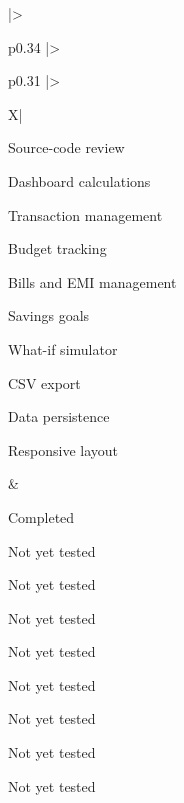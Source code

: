 \documentclass[12pt,a4paper]{article}
\begin{document}
\begin{tabularx}{\textwidth}{
|>{\raggedright\arraybackslash}p{0.34\textwidth}
|>{\raggedright\arraybackslash}p{0.31\textwidth}
|>{\raggedright\arraybackslash}X|
}
\parbox[t][14.45cm][t]{\linewidth}{
\begin{compresslist}
    \item Source-code review
    \vspace{1.00cm}
    \item Dashboard calculations
    \vspace{1.00cm}
    \item Transaction management
    \vspace{1.00cm}
    \item Budget tracking
    \vspace{0.60cm}
    \item Bills and EMI management
    \vspace{0.50cm}
    \item Savings goals
    \vspace{0.50cm}
    \item What-if simulator
    \vspace{0.75cm}
    \item CSV export
    \vspace{1.00cm}
    \item Data persistence
    \vspace{1.00cm}
    \item Responsive layout
\end{compresslist} 
}
&
\parbox[t][11.20cm][t]{\linewidth}{
\begin{compresslist}
    \item Completed
    \vspace{1.00cm}
    \item Not yet tested
    \vspace{1.00cm}
    \item Not yet tested
    \vspace{1.00cm}
    \item Not yet tested
    \vspace{0.60cm}
    \item Not yet tested
    \vspace{0.50cm}
    \item Not yet tested
    \vspace{0.50cm}
    \item Not yet tested
    \vspace{0.75cm}
    \item Not yet tested
    \vspace{1.00cm}
    \item Not yet tested
    \vspace{1.00cm}

\end{compresslist}}
\end{tabularx}
\end{document}
